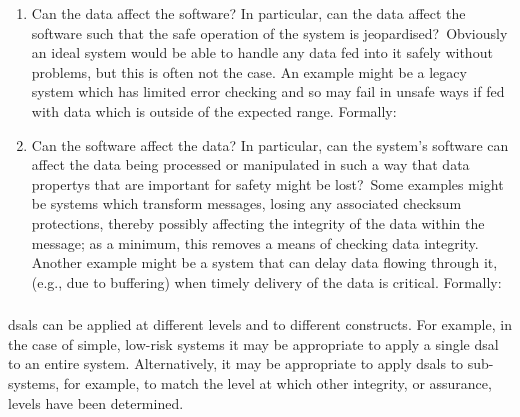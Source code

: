 \begin{enumerate}
  \item Can the data affect the software? In particular, \cbstart can the data affect the software such that the safe operation of the system is jeopardised?\cbend\ Obviously an ideal system would be able to handle any data fed into it safely without problems, but this is often not the case. An example might be a legacy system which has limited error checking and so may fail in unsafe ways if fed with data which is outside of the expected range. Formally\cbstart: \cbend{}
  \item Can the software affect the data? In particular, \cbstart can the system's software can affect the data being processed or manipulated in such a way that \glspl{data property} that are important for safety might be lost?\cbend\ Some examples might be systems which transform messages, losing any associated checksum protections, thereby possibly affecting the \gls{integrity} of the data within the message; as a minimum, this removes a means of checking data \gls{integrity}. Another example might be a system that can delay data flowing through it, (e.g., due to buffering) when timely delivery of the data is critical. Formally\cbstart:\cbend\ 
\end{enumerate}

\subsubsection{}\label{bkm:activities:analyse:tailoring}
\glspl{dsal} can be applied at different levels and to different constructs. For example, in the case of simple, low-risk systems it may be appropriate to apply a single \gls{dsal} to an entire system. Alternatively, it may be appropriate to apply \glspl{dsal} to sub-systems, for example, to match the level at which other \gls{integrity}, or assurance, levels have been determined. 

